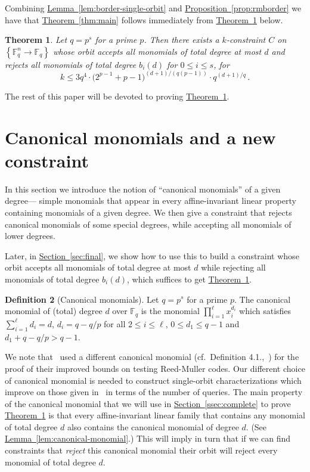 \documentclass[10pt]{article}
\newtheorem{theorem}{Theorem}[section]
\theoremstyle{definition}
\newtheorem{definition}[theorem]{Definition}
\numberwithin{equation}{section}
\newcommand{\expref}[2]{\texorpdfstring{\hyperref[#2]{#1~\ref{#2}}}{#1~\ref{#2}}}
\newcommand{\F}{{\mathbb{F}}}
\newcommand{\set}[1]{\left\{{#1}\right\}}
\begin{document}
Combining \expref{Lemma}{lem:border-single-orbit}
and \expref{Proposition}{prop:rmborder}
we have that \expref{Theorem}{thm:main}
follows immediately from \expref{Theorem}{thm:main2} below.

\begin{theorem}\label{thm:main2}
Let $q=p^s$ for a prime $p$.
Then there exists a $k$-constraint $C$ on $\set{\F_q^n \to \F_q}$ whose orbit
accepts all monomials
of total degree at most $d$
and rejects all
monomials of total degree $b_i(d)$ for $0 \leq i \leq s$,
for \[k \leq 3q^4 \cdot \big(2^{p-1}+p-1\big)^{(d+1)/(q(p-1))} \cdot q^{(d+1)/q}\,.\]
\end{theorem}

The rest of this paper will be devoted to proving \expref{Theorem}{thm:main2}.

\setcounter{section}{2}
\section{Canonical monomials and a new constraint}
\label{sec:main}

In this section we introduce the notion of ``canonical monomials''
of a given degree---%
simple %
monomials that appear in every affine-invariant
linear property containing monomials of a given degree.
We then give a constraint that rejects canonical monomials of
some special degrees, while accepting all monomials of lower degrees.

Later, in \expref{Section}{sec:final}, we show how to use this to build
a constraint whose orbit accepts all monomials of total degree at most $d$ while rejecting
all monomials of total degree $b_i(d)$, which suffices to get \expref{Theorem}{thm:main2}.

\begin{definition}[Canonical monomials]\label{defn:canonical-monomial}
Let $q=p^s$ for a prime $p$. The canonical monomial of (total) degree $d$ over $\F_q$ is the monomial $\prod_{i=1}^{\ell} x_i^{d_i} $
which satisfies $\sum_{i=1}^{\ell} d_i = d$,
$d_i = q-q/p$ for all $2 \leq i \leq \ell$,  $0 \leq d_1 \leq q-1$ and  $d_1 + q-q/p > q -1$.
\end{definition}

We note that~\cite{HSS11} used a different canonical monomial (cf.\ Definition 4.1.,~\cite{HSS11}) for the proof of their improved bounds on testing Reed-Muller codes.
Our different choice of canonical monomial is needed to construct single-orbit characterizations which improve on those given in~\cite{HSS11}
in terms of the number of queries.
The main property of the canonical monomial that we will use in
\expref{Section}{ssec:complete}
to prove \expref{Theorem}{thm:main2} is that
every affine-invariant linear family that contains any monomial
of total degree $d$ also contains the canonical monomial of degree $d$.
(See \expref{Lemma}{lem:canonical-monomial}.) 
This will imply in turn that if we can find constraints
that \emph{reject} this canonical monomial their orbit will reject every monomial
of total degree $d$.
\end{document}
